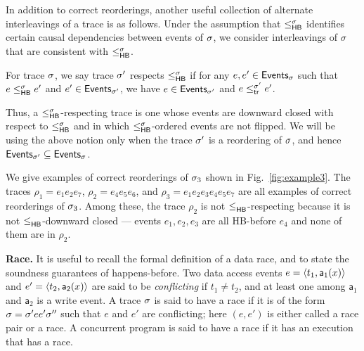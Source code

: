 In addition to correct reorderings, another useful collection of
alternate interleavings of a trace is as follows. Under the assumption
that $\leq^{\sigma}_{\mathsf{HB}}$ identifies certain causal dependencies between events
of $\sigma$, we consider interleavings of $\sigma$ that are consistent
with $\leq^{\sigma}_{\mathsf{HB}}$.
%
\begin{definition}
\label{def:hb-respecting}
For trace $\sigma$, we say trace $\sigma'$ respects $\leq^{\sigma}_{\mathsf{HB}}$ if for any
$e,e' \in \mathsf{Events}_{\sigma}$ such that $e \leq^{\sigma}_{\mathsf{HB}} e'$ and
$e' \in \mathsf{Events}_{\sigma'}$, we have $e \in \mathsf{Events}_{\sigma'}$ and
$e \leq^{\sigma'}_{\mathsf{tr}} e'$. 
\end{definition}
%
Thus, a $\leq^{\sigma}_{\mathsf{HB}}$-respecting trace is one whose events are downward
closed with respect to $\leq^{\sigma}_{\mathsf{HB}}$ and in which $\leq^{\sigma}_{\mathsf{HB}}$-ordered events are not
flipped. We will be using the above notion only when the trace $\sigma'$
is a reordering of $\sigma$, and hence $\mathsf{Events}_{\sigma'} \subseteq \mathsf{Events}_{\sigma}$.

\begin{example}
\label{ex:reorderings}
We give examples of correct reorderings of $\sigma_3$ shown in
Fig.~\ref{fig:example3}. The traces $\rho_1 = e_1e_2e_7$, $\rho_2 =
e_4e_5e_6$, and $\rho_3 = e_1e_2e_3e_4e_5e_7$ are all examples of
correct reorderings of $\sigma_3$. Among these, the trace $\rho_2$ is not
$\leq^{}_{\mathsf{HB}}$-respecting because it is not $\leq^{}_{\mathsf{HB}}$-downward closed ---
events $e_1,e_2,e_3$ are all HB-before $e_4$ and none of them are in
$\rho_2$.
\end{example}

\vspace*{0.1in}
\noindent
{\bf Race.} It is useful to recall the formal definition of a data
race, and to state the soundness guarantees of happens-before. Two
data access events $e = \langle t_1, \mathsf{a}_1(x)\rangle$ and $e'
= \langle t_2,\mathsf{a}_2(x)\rangle$ are said to be \emph{conflicting} if
$t_1 \neq t_2$, and at least one among $\mathsf{a}_1$ and
$\mathsf{a}_2$ is a write event. A trace $\sigma$ is said to have a race
if it is of the form $\sigma = \sigma' e e' \sigma''$ such that $e$ and $e'$
are conflicting; here $(e,e')$ is either called a race pair or a
race. A concurrent program is said to have a race if it has an
execution that has a race.

